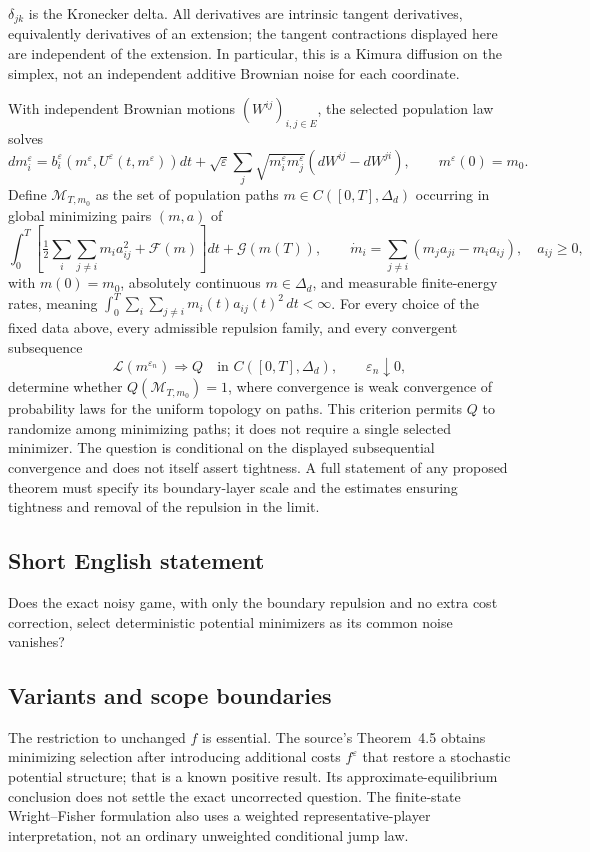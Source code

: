 \documentclass[11pt,a4paper]{article}
\begin{document}
$\delta_{jk}$ is the Kronecker delta. All derivatives are intrinsic tangent derivatives, equivalently derivatives of an extension; the tangent contractions displayed here are independent of the extension. In particular, this is a Kimura diffusion on the simplex, not an independent additive Brownian noise for each coordinate.

With independent Brownian motions $(W^{ij})_{i,j\in E}$, the selected population law solves
\[
 dm_i^\varepsilon=b_i^\varepsilon(m^\varepsilon,U^\varepsilon(t,m^\varepsilon))dt
 +\sqrt\varepsilon\sum_j\sqrt{m_i^\varepsilon m_j^\varepsilon}(dW^{ij}-dW^{ji}),
 \qquad m^\varepsilon(0)=m_0.
\]
Define $\mathcal M_{T,m_0}$ as the set of population paths $m\in C([0,T],\Delta_d)$ occurring in global minimizing pairs $(m,a)$ of
\[
 \int_0^T\left[\tfrac12\sum_i\sum_{j\ne i}m_i a_{ij}^2+\mathcal F(m)\right]dt
 +\mathcal G(m(T)),\qquad
 \dot m_i=\sum_{j\ne i}(m_ja_{ji}-m_ia_{ij}),\quad a_{ij}\geq0,
\]
with $m(0)=m_0$, absolutely continuous $m\in\Delta_d$, and measurable finite-energy rates, meaning $\int_0^T\sum_i\sum_{j\ne i}m_i(t)a_{ij}(t)^2\,dt<\infty$. For every choice of the fixed data above, every admissible repulsion family, and every convergent subsequence
\[
 \mathcal L(m^{\varepsilon_n})\Longrightarrow Q
 \quad\text{in }C([0,T],\Delta_d),\qquad \varepsilon_n\downarrow0,
\]
determine whether $Q(\mathcal M_{T,m_0})=1$, where convergence is weak convergence of probability laws for the uniform topology on paths. This criterion permits $Q$ to randomize among minimizing paths; it does not require a single selected minimizer. The question is conditional on the displayed subsequential convergence and does not itself assert tightness. A full statement of any proposed theorem must specify its boundary-layer scale and the estimates ensuring tightness and removal of the repulsion in the limit.
\subsection*{Short English statement}
Does the exact noisy game, with only the boundary repulsion and no extra cost correction, select deterministic potential minimizers as its common noise vanishes?
\subsection*{Variants and scope boundaries}
The restriction to unchanged $f$ is essential. The source's Theorem~4.5 obtains minimizing selection after introducing additional costs $f^\varepsilon$ that restore a stochastic potential structure; that is a known positive result. Its approximate-equilibrium conclusion does not settle the exact uncorrected question. The finite-state Wright--Fisher formulation also uses a weighted representative-player interpretation, not an ordinary unweighted conditional jump law.
\end{document}
